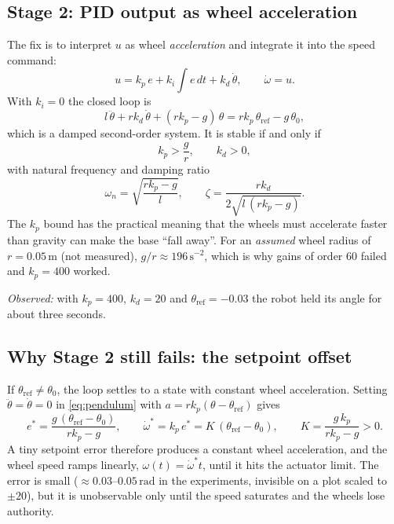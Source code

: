 \documentclass[11pt,a4paper]{article}
\begin{document}
\subsection{Stage 2: PID output as wheel acceleration}
\label{sec:stage2}
The fix is to interpret $u$ as wheel \emph{acceleration} and integrate it into
the speed command:
\begin{equation}
  u = k_p\,e + k_i\!\int e\,dt + k_d\,\dot\theta, \qquad
  \dot\omega = u .
  \label{eq:stage2}
\end{equation}
With $k_i = 0$ the closed loop is
\begin{equation}
  l\,\ddot\theta + r k_d\,\dot\theta + (r k_p - g)\,\theta
  = r k_p\,\theta_\mathrm{ref} - g\,\theta_0 ,
\end{equation}
which is a damped second-order system. It is stable if and only if
\begin{equation}
  k_p > \frac{g}{r}, \qquad k_d > 0 ,
  \label{eq:stability}
\end{equation}
with natural frequency and damping ratio
\begin{equation}
  \omega_n = \sqrt{\frac{r k_p - g}{l}}, \qquad
  \zeta = \frac{r k_d}{2\sqrt{l\,(r k_p - g)}} .
\end{equation}
The $k_p$ bound has the practical meaning that the wheels must accelerate
faster than gravity can make the base ``fall away''. For an
\emph{assumed} wheel radius of $r = 0.05\,\mathrm{m}$ (not measured),
$g/r \approx 196\,\mathrm{s^{-2}}$, which is why gains of order $60$ failed
and $k_p = 400$ worked.

\emph{Observed:} with $k_p = 400$, $k_d = 20$ and $\theta_\mathrm{ref}=-0.03$
the robot held its angle for about three seconds.

\subsection{Why Stage 2 still fails: the setpoint offset}
\label{sec:offset}
If $\theta_\mathrm{ref} \neq \theta_0$, the loop settles to a state with
constant wheel acceleration. Setting $\ddot\theta=\dot\theta=0$ in
\eqref{eq:pendulum} with $a = r k_p(\theta-\theta_\mathrm{ref})$ gives
\begin{equation}
  e^{*} = \frac{g\,(\theta_\mathrm{ref}-\theta_0)}{r k_p - g},
  \qquad
  \dot\omega^{*} = k_p\,e^{*} = K\,(\theta_\mathrm{ref}-\theta_0),
  \qquad
  K = \frac{g\,k_p}{r k_p - g} > 0 .
  \label{eq:steady}
\end{equation}
A tiny setpoint error therefore produces a constant wheel acceleration, and the
wheel speed ramps linearly, $\omega(t)=\dot\omega^{*}t$, until it hits the
actuator limit. The error is small ($\approx 0.03$--$0.05\,\mathrm{rad}$ in the
experiments, invisible on a plot scaled to $\pm20$), but it is
unobservable only until the speed saturates and the wheels lose authority.
\end{document}
